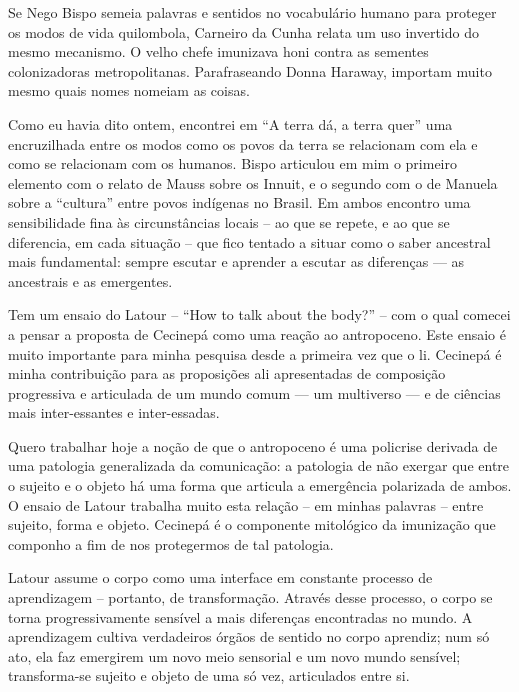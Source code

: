Se Nego Bispo semeia palavras e sentidos no vocabulário humano para proteger os modos de vida quilombola, Carneiro da Cunha relata um uso invertido do mesmo mecanismo. O velho chefe imunizava honi contra as sementes colonizadoras metropolitanas. Parafraseando Donna Haraway, importam muito mesmo quais nomes nomeiam as coisas.

Como eu havia dito ontem, encontrei em \enquote{A terra dá, a terra quer} uma encruzilhada entre os modos como os povos da terra se relacionam com ela e como se relacionam com os humanos. Bispo articulou em mim o primeiro elemento com o relato de Mauss sobre os Innuit, e o segundo com o de Manuela sobre a \enquote{cultura} entre povos indígenas no Brasil. Em ambos encontro uma sensibilidade fina às circunstâncias locais -- ao que se repete, e ao que se diferencia, em cada situação -- que fico tentado a situar como o saber ancestral mais fundamental: sempre escutar e aprender a escutar as diferenças --- as ancestrais e as emergentes.


Tem um ensaio do Latour -- \enquote{How to talk about the body?} -- com o qual comecei a pensar a proposta de Cecinepá como uma reação ao antropoceno. Este ensaio é muito importante para minha pesquisa desde a primeira vez que o li. Cecinepá é minha contribuição para as proposições ali apresentadas de composição progressiva e articulada de um mundo comum --- um multiverso --- e de ciências mais inter-essantes e inter-essadas.

Quero trabalhar hoje a noção de que o antropoceno é uma policrise derivada de uma patologia generalizada da comunicação: a patologia de não exergar que entre o sujeito e o objeto há uma forma que articula a emergência polarizada de ambos. O ensaio de Latour trabalha muito esta relação -- em minhas palavras -- entre sujeito, forma e objeto. Cecinepá é o componente mitológico da imunização que componho a fim de nos protegermos de tal patologia.

Latour assume o corpo como uma interface em constante processo de aprendizagem -- portanto, de transformação. Através desse processo, o corpo se torna progressivamente sensível a mais diferenças encontradas no mundo. A aprendizagem cultiva verdadeiros órgãos de sentido no corpo aprendiz; num só ato, ela faz emergirem um novo meio sensorial e um novo mundo sensível; transforma-se sujeito e objeto de uma só vez, articulados entre si.

